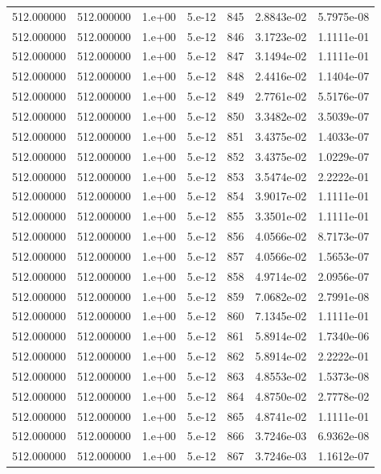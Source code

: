\begin{table}[htbp]
\begin{tabular}{rrrrrrr}
512.000000 & 512.000000 & 1.e+00 & 5.e-12 & 845 & 2.8843e-02 & 5.7975e-08 \\
512.000000 & 512.000000 & 1.e+00 & 5.e-12 & 846 & 3.1723e-02 & 1.1111e-01 \\
512.000000 & 512.000000 & 1.e+00 & 5.e-12 & 847 & 3.1494e-02 & 1.1111e-01 \\
512.000000 & 512.000000 & 1.e+00 & 5.e-12 & 848 & 2.4416e-02 & 1.1404e-07 \\
512.000000 & 512.000000 & 1.e+00 & 5.e-12 & 849 & 2.7761e-02 & 5.5176e-07 \\
512.000000 & 512.000000 & 1.e+00 & 5.e-12 & 850 & 3.3482e-02 & 3.5039e-07 \\
512.000000 & 512.000000 & 1.e+00 & 5.e-12 & 851 & 3.4375e-02 & 1.4033e-07 \\
512.000000 & 512.000000 & 1.e+00 & 5.e-12 & 852 & 3.4375e-02 & 1.0229e-07 \\
512.000000 & 512.000000 & 1.e+00 & 5.e-12 & 853 & 3.5474e-02 & 2.2222e-01 \\
512.000000 & 512.000000 & 1.e+00 & 5.e-12 & 854 & 3.9017e-02 & 1.1111e-01 \\
512.000000 & 512.000000 & 1.e+00 & 5.e-12 & 855 & 3.3501e-02 & 1.1111e-01 \\
512.000000 & 512.000000 & 1.e+00 & 5.e-12 & 856 & 4.0566e-02 & 8.7173e-07 \\
512.000000 & 512.000000 & 1.e+00 & 5.e-12 & 857 & 4.0566e-02 & 1.5653e-07 \\
512.000000 & 512.000000 & 1.e+00 & 5.e-12 & 858 & 4.9714e-02 & 2.0956e-07 \\
512.000000 & 512.000000 & 1.e+00 & 5.e-12 & 859 & 7.0682e-02 & 2.7991e-08 \\
512.000000 & 512.000000 & 1.e+00 & 5.e-12 & 860 & 7.1345e-02 & 1.1111e-01 \\
512.000000 & 512.000000 & 1.e+00 & 5.e-12 & 861 & 5.8914e-02 & 1.7340e-06 \\
512.000000 & 512.000000 & 1.e+00 & 5.e-12 & 862 & 5.8914e-02 & 2.2222e-01 \\
512.000000 & 512.000000 & 1.e+00 & 5.e-12 & 863 & 4.8553e-02 & 1.5373e-08 \\
512.000000 & 512.000000 & 1.e+00 & 5.e-12 & 864 & 4.8750e-02 & 2.7778e-02 \\
512.000000 & 512.000000 & 1.e+00 & 5.e-12 & 865 & 4.8741e-02 & 1.1111e-01 \\
512.000000 & 512.000000 & 1.e+00 & 5.e-12 & 866 & 3.7246e-03 & 6.9362e-08 \\
512.000000 & 512.000000 & 1.e+00 & 5.e-12 & 867 & 3.7246e-03 & 1.1612e-07 \\

\end{tabular}
\end{table}
